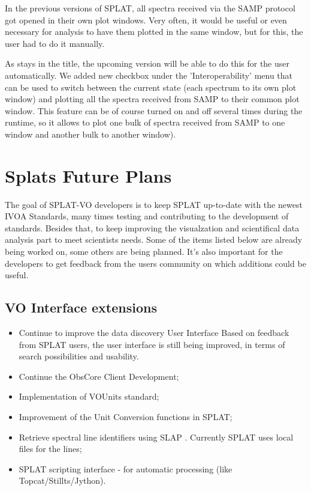 \documentclass[final,authoryear,5p,times,twocolumn]{elsarticle}
\begin{document}
In the previous versions of SPLAT, all spectra received via the SAMP
protocol got opened in their own plot windows. Very often, it would be
useful or even necessary for analysis to have them plotted in the same
window, but for this, the user had to do it manually.

As stays in the title, the upcoming version will be able to do this
for the user automatically. We added new checkbox under the
'Interoperability' menu that can be used to switch between the current
state (each spectrum to its own plot window) and plotting all the
spectra received from SAMP to their common plot window. This feature
can be of course turned on and off several times during the runtime,
so it allows to plot one bulk of spectra received from SAMP to one
window and another bulk to another window).

\section{Splats Future Plans}

The goal of SPLAT-VO developers is to keep SPLAT up-to-date with the
newest IVOA Standards, many times testing and contributing to the
development of standards. Besides that, to keep improving the
visualzation and scientifical data analysis part to meet scientists
needs.  Some of the items listed below are already being worked on,
some others are being planned. It's also important for the developers
to get feedback from the users community on which additions could be
useful.

\subsection{VO Interface extensions}
\begin{itemize}
\item Continue to improve the data discovery User Interface
Based on feedback from SPLAT users, the user interface is still being
improved, in terms of search possibilities and usability.
\item Continue the ObsCore Client Development;
\item Implementation of  VOUnits \citep{vounits} standard;
\item	Improvement of the Unit Conversion functions in SPLAT;
\item Retrieve spectral line identifiers using SLAP \citep[Simple Line
  Access Protocol;][]{slap}. Currently SPLAT uses local files for the
  lines;
\item  SPLAT scripting interface - for automatic processing (like Topcat/Stillts/Jython).
\end{itemize}
\end{document}
